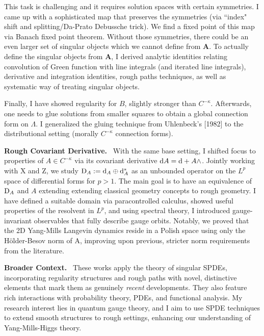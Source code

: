 \documentclass[./Research_statement.tex]{subfiles}
\newcommand{\bfA}{\mathbf{A}}
\begin{document}
This task is challenging and it requires solution spaces  with certain symmetries. I came up with a sophisticated map that preserves the symmetries (via ``index" shift and splitting/Da-Prato Debussche trick). We find a fixed point of this map via Banach fixed point theorem. Without those symmetries, there could be an even larger set of singular objects which we cannot define from $\bfA$. 
%
To actually define the singular objects from $\bfA$, I derived analytic identities relating convolution of Green function with line integrals (and iterated line integrals), derivative and integration identities, rough paths techniques, as well as systematic way of treating singular objects. 

Finally, I have showed regularity for $B$, slightly stronger than $C^{-\kappa}$. Afterwards, one needs to glue solutions from smaller squares to obtain a global connection form on $\Lambda$. I generalized the gluing technique from Uhlenbeck's [1982] to the distributional setting (morally $C^{-\kappa}$ connection forms). 

\vspace{2pt}

\noindent \textbf{Rough Covariant Derivative.}\ 
%
With the same base setting, I shifted focus to properties of $A\in C^{-\kappa}$ via its covariant derivative $\mathrm{d} A = \mathrm{d} + A\wedge $. Jointly working with X and Z, we study $\mathrm{D}_A:=\mathrm{d}_A\oplus\mathrm{d}_A^*$ as an unbounded operator on the $L^p$  space of differential forms for $p>1$.  The main goal is to have an equivalence of $\mathrm{D}_A$ and $A$ extending extending classical geometry concepts to rough geometry. I have defined a suitable domain via paracontrolled calculus, showed useful properties of the resolvent in $L^p$, and using spectral theory, I introduced gauge-invariant observables that fully describe gauge orbits. Notably, we proved that the 2D Yang-Mills Langevin dynamics reside in a Polish space using only the H\"older-Besov norm of A, improving upon previous, stricter norm requirements from the literature.

\vspace{2pt}

\noindent \textbf{Broader Context.}\ 
%
%
These works apply the theory of singular SPDEs, incorporating regularity structures and rough paths with novel, distinctive elements that mark them as genuinely \textit{recent} developments. They also feature rich interactions with probability theory, PDEs, and functional analysis. My research interest lies in quantum gauge theory, and I aim to use SPDE techniques to extend smooth structures to rough settings, enhancing our understanding of Yang-Mills-Higgs theory. 
%
\end{document}
